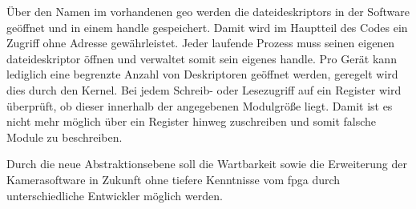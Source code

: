 Über den Namen im vorhandenen \ac{geo} werden die \glspl{dateideskriptor} in der Software geöffnet und in einem \gls{handle} gespeichert. Damit wird im Hauptteil des Codes ein Zugriff ohne Adresse gewährleistet. Jeder laufende Prozess muss seinen eigenen \gls{dateideskriptor} öffnen und verwaltet somit sein eigenes \gls{handle}. Pro Gerät kann lediglich eine begrenzte Anzahl von Deskriptoren geöffnet werden, geregelt wird dies durch den Kernel. 
Bei jedem Schreib- oder Lesezugriff auf ein Register wird überprüft, ob dieser innerhalb der angegebenen Modulgröße liegt. Damit ist es nicht mehr möglich über ein Register hinweg zuschreiben und somit falsche Module zu beschreiben.


Durch die neue Abstraktionsebene soll die Wartbarkeit sowie die Erweiterung der Kamerasoftware in Zukunft ohne tiefere Kenntnisse vom \ac{fpga} durch unterschiedliche Entwickler möglich werden.









